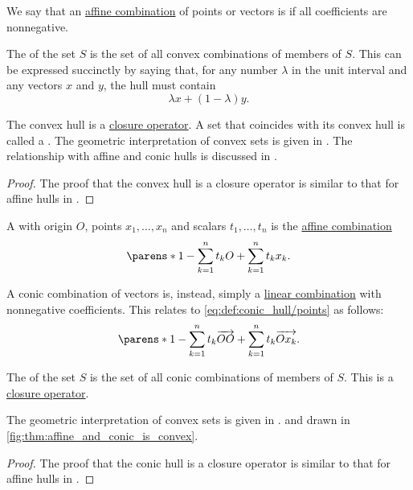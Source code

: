 \begin{definition}\label{def:convex_hull}\mimprovised
  We say that an \hyperref[rem:affine_combinations]{affine combination} of points or vectors is  if all coefficients are nonnegative.

  The  of the set \( S \) is the set of all convex combinations of members of \( S \). This can be expressed succinctly by saying that, for any number \( \lambda \) in the unit interval and any vectors \( x \) and \( y \), the hull must contain
  \begin{equation}\label{eq:def:convex_hull/combination}
    \lambda x + (1 - \lambda) y.
  \end{equation}

  The convex hull is a \hyperref[def:abstract_closure_operator]{closure operator}. A set that coincides with its convex hull is called a . The geometric interpretation of convex sets is given in . The relationship with affine and conic hulls is discussed in .
\end{definition}
\begin{proof}
  The proof that the convex hull is a closure operator is similar to that for affine hulls in .
\end{proof}

\begin{definition}\label{def:conic_hull}\mimprovised
  A  with origin \( O \), points \( x_1, \ldots, x_n \) and  scalars \( t_1, \ldots, t_n \) is the \hyperref[rem:affine_combination]{affine combination}
  \begin{equation}\label{eq:def:conic_hull/points}
    \parens*{ 1 - \sum_{k=1}^n t_k } O + \sum_{k=1}^n t_k x_k.
  \end{equation}

  A conic combination of vectors is, instead, simply a \hyperref[rem:linear_combinations]{linear combination} with nonnegative coefficients. This relates to \eqref{eq:def:conic_hull/points} as follows:
  \begin{equation*}
    \parens*{ 1 - \sum_{k=1}^n t_k } \vect{OO} + \sum_{k=1}^n t_k \vect{O x_k}.
  \end{equation*}

  The  of the set \( S \) is the set of all conic combinations of members of \( S \). This is a \hyperref[def:abstract_closure_operator]{closure operator}.

  The geometric interpretation of convex sets is given in . and drawn in \cref{fig:thm:affine_and_conic_is_convex}.
\end{definition}
\begin{proof}
  The proof that the conic hull is a closure operator is similar to that for affine hulls in .
\end{proof}

